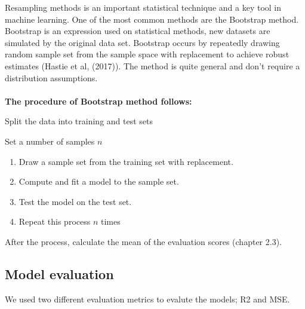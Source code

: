 \documentclass[a4paper]{article}
\begin{document}
Resampling methods is an important statistical technique and a key tool in machine learning. One of the most common methods are the Bootstrap method. Bootstrap is an expression used on statistical methods, new datasets are simulated by the original data set. Bootstrap occurs by repeatedly drawing random sample set from the sample space with replacement to achieve robust estimates (Hastie et al, (2017)). The method is quite general and don't require a distribution assumptions. \\
\\
\textbf{The procedure of Bootstrap method follows:}

Split the data into training and test sets

Set a number of samples  $n$

\begin{enumerate}
	\item Draw a sample set from the training set with replacement.
	\item Compute and fit a model to the sample set.
	\item Test the model on the test set. 
	\item Repeat this process $n$ times
\end{enumerate}
After the process, calculate the mean of the evaluation scores (chapter 2.3).



\subsection{Model evaluation}

We used two different evaluation metrics to evalute the models; R2 and MSE.
\end{document}
